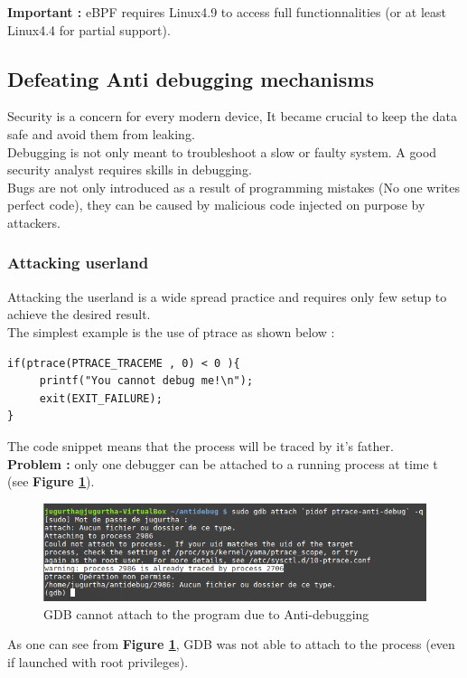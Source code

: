 \textbf{\color{red}Important : } eBPF requires Linux4.9 to access full functionnalities (or at least Linux4.4 for partial support).

\subsection{Defeating Anti debugging mechanisms}
Security is a concern for every modern device, It became crucial to keep the data safe and avoid them from leaking.\\
Debugging is not only meant to troubleshoot a slow or faulty system. A good security analyst requires skills in debugging.\\
Bugs are not only introduced as a result of programming mistakes (No one writes perfect code), they can be caused by malicious code injected on purpose by attackers.

\subsubsection{Attacking userland}
Attacking the userland is a wide spread practice and requires only few setup to achieve the desired result.\\

The simplest example is the use of ptrace as shown below :
	\begin{lstlisting}[style=CStyle]
if(ptrace(PTRACE_TRACEME , 0) < 0 ){
     printf("You cannot debug me!\n");
     exit(EXIT_FAILURE);
}
    	\end{lstlisting}
The code snippet means that the process will be traced by it's father. \\

\textbf{\color{red}Problem : } only one debugger can be attached to a running process at time t (see \textbf{Figure \ref{GDB cannot attach to the program due to Anti-debugging}}).
    		\begin{figure}[H]
					\centering
        			\includegraphics[scale=0.45]{img/solution/gdb-cannot-be-attached.png}
        			\caption{GDB cannot attach to the program due to Anti-debugging}
        			\label{GDB cannot attach to the program due to Anti-debugging}
   			 \end{figure}
   			 As one can see from \textbf{Figure \ref{GDB cannot attach to the program due to Anti-debugging}}, GDB was not able to attach to the process (even if launched with root privileges).
   			 
